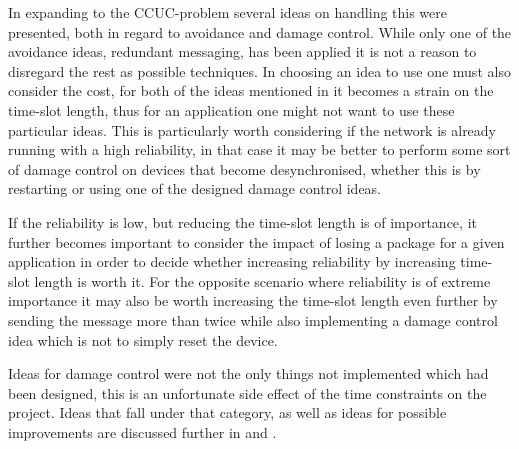 \bigskip \noindent
In expanding to the CCUC-problem several ideas on handling this were presented, both in regard to avoidance and damage control.
While only one of the avoidance ideas, redundant messaging, has been applied it is not a reason to disregard the rest as possible techniques.
In choosing an idea to use one must also consider the cost, for both of the ideas mentioned in  it becomes a strain on the time-slot length, thus for an application one might not want to use these particular ideas.
This is particularly worth considering if the network is already running with a high reliability, in that case it may be better to perform some sort of damage control on devices that become desynchronised, whether this is by restarting or using one of the designed damage control ideas. 

If the reliability is low, but reducing the time-slot length is of importance, it further becomes important to consider the impact of losing a package for a given application in order to decide whether increasing reliability by increasing time-slot length is worth it.
For the opposite scenario where reliability is of extreme importance it may also be worth increasing the time-slot length even further by sending the message more than twice while also implementing a damage control idea which is not to simply reset the device.

\bigskip \noindent
Ideas for damage control were not the only things not implemented which had been designed, this is an unfortunate side effect of the time constraints on the project.
Ideas that fall under that category, as well as ideas for possible improvements are discussed further in  and .
